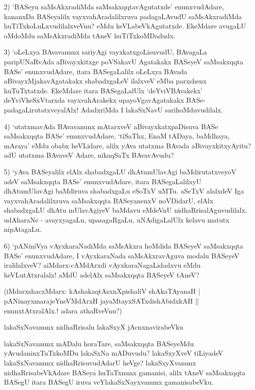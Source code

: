 2) `BASeyu saMsAkxradiMda saMsakxqqtavAgutatxde' enunxvudAdare, kananxDa BASeyalilx vayxvahAradalilxruva padagaLAvudU saMsAkxradiMda huTiTxkoLuLxvudilalxveVnu? eMdu keVLabeVkAgutatxde. EkeMdare avugaLU oMdoMdu saMsAkxradiMda tAneV huTiTxkoMDadudx.

3) `oLeLxya BAvavanunx sariyAgi vayxkatxgoLisuvudU, BAvagaLa paripUNaRvAda aBivayxkitxge poVSakavU Agatakakx BASeyeV saMsakxqqta BASe' enunxvudAdare, itara BASegaLalilx oLeLxya BAvada aBivayxMjakavAgatakakx shabadxgaLeV ilalxveV eMba parxshenx huTuTxtatxde. EkeMdare itara BASegaLalUlx `deYviVBAvakekx' deYviVkeSxVtarxda vayxvahArakekx upayoVgavAgatakakx BASe-padagaLirutatxveyalAlx! AdadxriMda I lakaSxNavU sarihoMduvudilalx.

4) `utatxmavAda BAvavanunx mAtarxveV aBivayxkatxpaDisuva BASe saMsakxqqta BASe' enunxvudAdare, `tiSaThx, EnaM tADaya, baMdhaya, mAraya' eMdu obabx heVLidare, alilx yAva utatxma BAvada aBivayxkitxyAyitu? adU utatxma BAvaveV Adare, nikaqSaTx BAvavAvudu?

5) `yAva BASeyalilx elAlx shabadxgaLU dhAtumUlavAgi baMdirutatxveyoV adeV saMsakxqqta BASe' enunxvudAdare, itara BASegaLalilxyU dhAtumUlavAgi baMdiruva shabadxgaLu eSoTxV uMTu. aSeTxV alalxdeV Iga vayxvahAradalilxruva saMsakxqqta BASeyanenxV noVDidarU, elAlx shabadxgaLU dhAtu mUlavAgiyeV baMdavu eMdeVnU nidhaRrisalAguvudilalx. udAharaNe - avayxyagaLu, upasagaRgaLu, uNAdigaLalUlx kelavu matutx nipAtagaLu.

6) `pANiniVya vAyxkaraNadiMda saMsAkxra hoMdida BASeyeV saMsakxqqta BASe' enunxvudAdare, I vAyxkaraNada saMsAkxravAguva modalu BASeyeV iralilalxveV? aiMdarx-cAMdArxdi vAyxkaraNagaLidadxvu eMdu heVLutAtxralalx! aMdU adelAlx saMsakxqqta BASeyeV tAneV?

\begin{shloka}
(iMdarxshacxMdarx: kAshakaqtAsxnXpishaliV shAkaTAyanaH |\\
pANinayxmarajeYneVMdArxH jayaMtayxSATxdishAbidxkAH ||\\
enunxtAtxralAlx.! adara athaRveVnu?)
\end{shloka}

lakaSxNavanunx nidhaRrisalu lakaSxyX jAcnxnavirabeVku

lakaSxNavanunx mADalu horaTare, saMsakxqqta BASeyeMdu yAvudaninxTuTxkoMDu lakaSxNa mADuvudu? lakaSxyXveV tiLiyadeV lakaSxNavanunx nidhaRrisuvudAdarU heVge? lakaSxyXvanunx nidhaRrisabeVkAdare BASeya huTaTxnunx gamanisi, alilx tAneV saMsakxqqta BASegU itara BASegU iruva veYlakaSxNayxvanunx gamanisabeVku.

